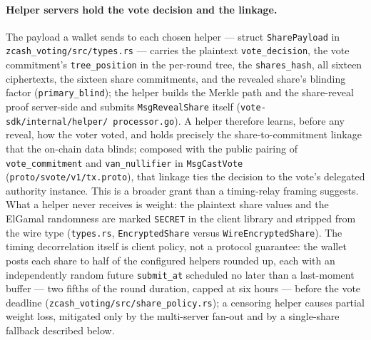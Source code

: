 \documentclass[11pt,a4paper]{article}
\theoremstyle{definition}
\begin{document}
\paragraph{Helper servers hold the vote decision and the linkage.} The
payload a wallet sends to each chosen helper --- struct
\texttt{SharePayload} in \texttt{zcash\_voting/src/types.rs} --- carries
the plaintext \texttt{vote\_decision}, the vote commitment's
\texttt{tree\_position} in the per-round tree, the \texttt{shares\_hash},
all sixteen ciphertexts, the sixteen share commitments, and the revealed
share's blinding factor (\texttt{primary\_blind}); the helper builds the
Merkle path and the share-reveal proof server-side and submits
\texttt{MsgRevealShare} itself (\texttt{vote-sdk/internal/helper/%
processor.go}). A helper therefore learns, before any reveal, how the
voter voted, and holds precisely the share-to-commitment linkage that the
on-chain data blinds; composed with the public pairing of
\texttt{vote\_commitment} and \texttt{van\_nullifier} in
\texttt{MsgCastVote} (\texttt{proto/svote/v1/tx.proto}), that linkage ties
the decision to the vote's delegated authority instance. This is a broader
grant than a timing-relay framing suggests. What a helper never receives
is weight: the plaintext share values and the ElGamal randomness are marked
\texttt{SECRET} in the client library and stripped from the wire type
(\texttt{types.rs}, \texttt{EncryptedShare} versus
\texttt{WireEncryptedShare}). The timing decorrelation itself is client
policy, not a protocol guarantee: the wallet posts each share to half of
the configured helpers rounded up, each with an independently random
future \texttt{submit\_at} scheduled no later than a last-moment buffer
--- two fifths of the round duration, capped at six hours --- before the
vote deadline (\texttt{zcash\_voting/src/share\_policy.rs}); a censoring
helper causes
partial weight loss, mitigated only by the multi-server fan-out and by a
single-share fallback described below.
\end{document}
